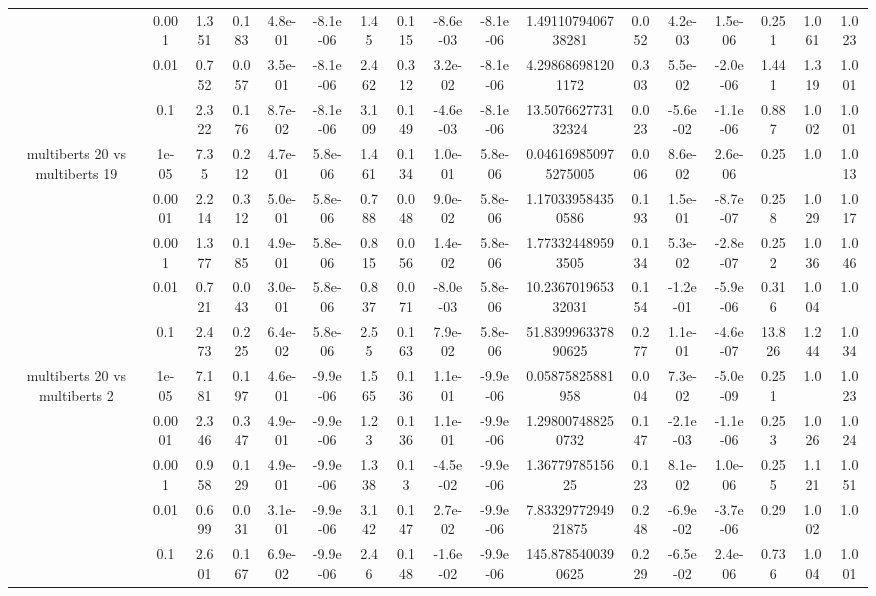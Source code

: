 \begin{tabular}{|c|c|c|c|c|c|c|c|c|c|c|c|c|c|c|c|c|}
 & 0.001 & 1.351 & 0.183 & 4.8e-01 & -8.1e-06 & 1.45 & 0.115 & -8.6e-03 & -8.1e-06 & 1.4911079406738281 & 0.052 & 4.2e-03 & 1.5e-06 & 0.251 & 1.061 & 1.023 \\
 & 0.01 & 0.752 & 0.057 & 3.5e-01 & -8.1e-06 & 2.462 & 0.312 & 3.2e-02 & -8.1e-06 & 4.298686981201172 & 0.303 & 5.5e-02 & -2.0e-06 & 1.441 & 1.319 & 1.001 \\
 & 0.1 & 2.322 & 0.176 & 8.7e-02 & -8.1e-06 & 3.109 & 0.149 & -4.6e-03 & -8.1e-06 & 13.507662773132324 & 0.023 & -5.6e-02 & -1.1e-06 & 0.887 & 1.002 & 1.001 \\
\hline
\multirow{5}{*}{multiberts 20 vs multiberts 19} & 1e-05 & 7.35 & 0.212 & 4.7e-01 & 5.8e-06 & 1.461 & 0.134 & 1.0e-01 & 5.8e-06 & 0.046169850975275005 & 0.006 & 8.6e-02 & 2.6e-06 & 0.25 & 1.0 & 1.013 \\
 & 0.0001 & 2.214 & 0.312 & 5.0e-01 & 5.8e-06 & 0.788 & 0.048 & 9.0e-02 & 5.8e-06 & 1.170339584350586 & 0.193 & 1.5e-01 & -8.7e-07 & 0.258 & 1.029 & 1.017 \\
 & 0.001 & 1.377 & 0.185 & 4.9e-01 & 5.8e-06 & 0.815 & 0.056 & 1.4e-02 & 5.8e-06 & 1.773324489593505 & 0.134 & 5.3e-02 & -2.8e-07 & 0.252 & 1.036 & 1.046 \\
 & 0.01 & 0.721 & 0.043 & 3.0e-01 & 5.8e-06 & 0.837 & 0.071 & -8.0e-03 & 5.8e-06 & 10.236701965332031 & 0.154 & -1.2e-01 & -5.9e-06 & 0.316 & 1.004 & 1.0 \\
 & 0.1 & 2.473 & 0.225 & 6.4e-02 & 5.8e-06 & 2.55 & 0.163 & 7.9e-02 & 5.8e-06 & 51.839996337890625 & 0.277 & 1.1e-01 & -4.6e-07 & 13.826 & 1.244 & 1.034 \\
\hline
\multirow{5}{*}{multiberts 20 vs multiberts 2} & 1e-05 & 7.181 & 0.197 & 4.6e-01 & -9.9e-06 & 1.565 & 0.136 & 1.1e-01 & -9.9e-06 & 0.05875825881958 & 0.004 & 7.3e-02 & -5.0e-09 & 0.251 & 1.0 & 1.023 \\
 & 0.0001 & 2.346 & 0.347 & 4.9e-01 & -9.9e-06 & 1.23 & 0.136 & 1.1e-01 & -9.9e-06 & 1.298007488250732 & 0.147 & -2.1e-03 & -1.1e-06 & 0.253 & 1.026 & 1.024 \\
 & 0.001 & 0.958 & 0.129 & 4.9e-01 & -9.9e-06 & 1.338 & 0.13 & -4.5e-02 & -9.9e-06 & 1.3677978515625 & 0.123 & 8.1e-02 & 1.0e-06 & 0.255 & 1.121 & 1.051 \\
 & 0.01 & 0.699 & 0.031 & 3.1e-01 & -9.9e-06 & 3.142 & 0.147 & 2.7e-02 & -9.9e-06 & 7.8332977294921875 & 0.248 & -6.9e-02 & -3.7e-06 & 0.29 & 1.002 & 1.0 \\
 & 0.1 & 2.601 & 0.167 & 6.9e-02 & -9.9e-06 & 2.46 & 0.148 & -1.6e-02 & -9.9e-06 & 145.8785400390625 & 0.229 & -6.5e-02 & 2.4e-06 & 0.736 & 1.004 & 1.001 \\

\end{tabular}
